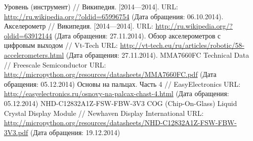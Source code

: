 \documentclass[document.tex]{subfiles}
\begin{document}
\clearpage
{}
\begin{thebibliography}{@@@@}	
		Уровень (инструмент) // Википедия. [2014—2014].
		URL: {\url{http://ru.wikipedia.org/?oldid=65996754}} 
		(Дата обращения: 06.10.2014).
		Акселерометр // Википедия. [2014—2014]. 
		URL: {\url{http://ru.wikipedia.org/?oldid=63912144}}
		(Дата обращения: 27.11.2014).
		Обзор акселерометров с цифровым выходом // Vt-Tech
		URL: {\url{http://vt-tech.eu/ru/articles/robotic/58-accelerometers.html}}
		(Дата обращения: 27.11.2014).
		MMA7660FC Technical Data // Freescale Semiconductor
		URL: {\url{http://micropython.org/resources/datasheets/MMA7660FC.pdf}}
		(Дата обращения: 05.12.2014)
		Основы на пальцах. Часть 4 // EasyElectronics
		URL: {\url{http://easyelectronics.ru/osnovy-na-palcax-chast-4.html}}
		(Дата обращения: 05.12.2014)
		NHD-C12832A1Z-FSW-FBW-3V3 COG (Chip-On-Glass) Liquid Crystal Display Module // Newhaven Display International
		URL: {\url{http://micropython.org/resources/datasheets/NHD-C12832A1Z-FSW-FBW-3V3.pdf}}
		(Дата обращения: 19.12.2014)
	\end{thebibliography}
\end{document}
